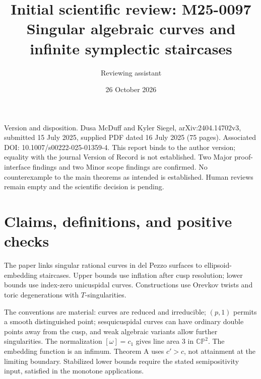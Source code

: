 \documentclass[10pt]{article}
\title{Initial scientific review: M25-0097
Singular algebraic curves and infinite symplectic staircases}
\author{Reviewing assistant}
\date{26 October 2026}
\begin{document}
\maketitle
Version and disposition. Dusa McDuff and Kyler Siegel, arXiv:2404.14702v3, submitted 15 July 2025, supplied PDF dated 16 July 2025 (75 pages). Associated DOI: 10.1007/s00222-025-01359-4. This report binds to the author version; equality with the journal Version of Record is not established. Two Major proof-interface findings and two Minor scope findings are confirmed. No counterexample to the main theorems as intended is established. Human reviews remain empty and the scientific decision is pending.\par
\section*{Claims, definitions, and positive checks}
The paper links singular rational curves in del Pezzo surfaces to ellipsoid-embedding staircases. Upper bounds use inflation after cusp resolution; lower bounds use index-zero unicuspidal curves. Constructions use Orevkov twists and toric degenerations with \(T\)-singularities.\par
The conventions are material: curves are reduced and irreducible; \((p,1)\) permits a smooth distinguished point; sesquicuspidal curves can have ordinary double points away from the cusp, and weak algebraic variants allow further singularities. The normalization \([\omega]=c_1\) gives line area \(3\) in \(\mathbb{CP}^2\). The embedding function is an infimum. Theorem A uses \(c'>c\), not attainment at the limiting boundary. Stabilized lower bounds require the stated semipositivity input, satisfied in the monotone applications.\par
\end{document}
